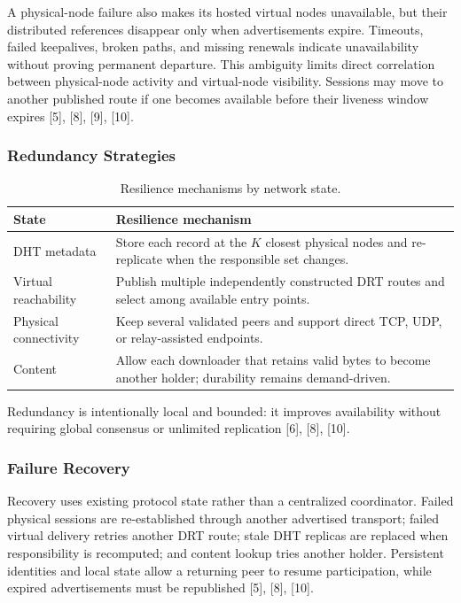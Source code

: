 \documentclass[12pt,a4paper]{article}
\begin{document}
A physical-node failure also makes its hosted virtual nodes unavailable, but their
distributed references disappear only when advertisements expire. Timeouts, failed
keepalives, broken paths, and missing renewals indicate unavailability without proving
permanent departure. This ambiguity limits direct correlation between physical-node
activity and virtual-node visibility. Sessions may move to another published route if
one becomes available before their liveness window expires [5], [8], [9], [10].

\subsubsection{Redundancy Strategies}

\begin{table}[H]
\centering
\caption{Resilience mechanisms by network state.}
\label{tab:resilience-mechanisms}
\begin{tabularx}{\textwidth}{L{0.24\textwidth} Y}
\toprule
\textbf{State} & \textbf{Resilience mechanism} \\
\midrule
DHT metadata & Store each record at the $K$ closest physical nodes and re-replicate
when the responsible set changes. \\
Virtual reachability & Publish multiple independently constructed DRT routes and
select among available entry points. \\
Physical connectivity & Keep several validated peers and support direct TCP, UDP,
or relay-assisted endpoints. \\
Content & Allow each downloader that retains valid bytes to become another holder;
durability remains demand-driven. \\
\bottomrule
\end{tabularx}
\end{table}

Redundancy is intentionally local and bounded: it improves availability without
requiring global consensus or unlimited replication [6], [8], [10].

\subsubsection{Failure Recovery}

Recovery uses existing protocol state rather than a centralized coordinator. Failed
physical sessions are re-established through another advertised transport; failed
virtual delivery retries another DRT route; stale DHT replicas are replaced when
responsibility is recomputed; and content lookup tries another holder. Persistent
identities and local state allow a returning peer to resume participation, while
expired advertisements must be republished [5], [8], [10].
\end{document}
